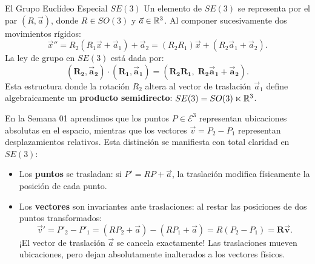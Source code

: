 \documentclass[11pt,letterpaper]{article}
\begin{document}
\begin{theorembox}{El Grupo Euclídeo Especial $SE(3)$}
Un elemento de $SE(3)$ se representa por el par $(R, \vec{a})$, donde $R \in SO(3)$ y $\vec{a} \in \mathbb{R}^3$. Al componer sucesivamente dos movimientos rígidos:
\[
\vec{x}'' = R_2(R_1 \vec{x} + \vec{a}_1) + \vec{a}_2 = (R_2 R_1)\vec{x} + (R_2 \vec{a}_1 + \vec{a}_2).
\]
La ley de grupo en $SE(3)$ está dada por:
\[
\mathbf{(R_2, \vec{a}_2) \cdot (R_1, \vec{a}_1) = (R_2 R_1, \; R_2\vec{a}_1 + \vec{a}_2)}.
\]
Esta estructura donde la rotación $R_2$ altera al vector de traslación $\vec{a}_1$ define algebraicamente un \textbf{producto semidirecto}: $SE(3) = SO(3) \ltimes \mathbb{R}^3$.
\end{theorembox}

En la Semana 01 aprendimos que los puntos $P \in \mathcal{E}^3$ representan ubicaciones absolutas en el espacio, mientras que los vectores $\vec{v} = P_2 - P_1$ representan desplazamientos relativos. Esta distinción se manifiesta con total claridad en $SE(3)$:
\begin{itemize}
    \item Los \textbf{puntos} se trasladan: si $P' = RP + \vec{a}$, la traslación modifica físicamente la posición de cada punto.
    \item Los \textbf{vectores} son invariantes ante traslaciones: al restar las posiciones de dos puntos transformados:
    \[
    \vec{v}' = P'_2 - P'_1 = (R P_2 + \vec{a}) - (R P_1 + \vec{a}) = R(P_2 - P_1) = \mathbf{R\vec{v}}.
    \]
    ¡El vector de traslación $\vec{a}$ se cancela exactamente! Las traslaciones mueven ubicaciones, pero dejan absolutamente inalterados a los vectores físicos.
\end{itemize}
\end{document}
